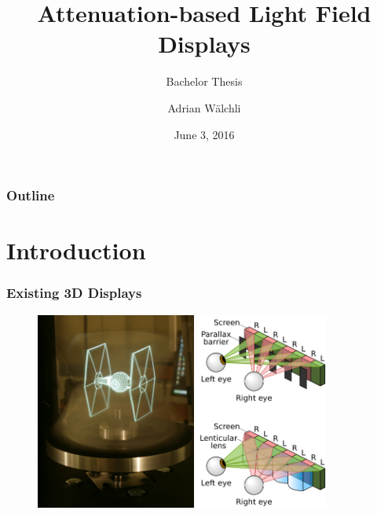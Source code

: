 \documentclass[12pt, compress]{beamer}
\title{Attenuation-based Light Field Displays}
\subtitle{Bachelor Thesis}
\date{June 3, 2016}
\author{Adrian W\"alchli}
\institute{Institut f\"ur Informatik und angewandte Mathematik}
\begin{document}
\setlength{\leftmargini}{0pt}
\setlength{\fboxsep}{0pt}%

\maketitle

\begin{frame}[fragile]
	\frametitle{Outline}
	\tableofcontents
\end{frame}

\section{Introduction}

\begin{frame}[fragile]
	\frametitle{Existing 3D Displays}
	
	\begin{figure}
		\captionsetup[sub]{font=scriptsize}
		{\includegraphics[height=6.5cm]{figures/overview_displays/360_deg_display}}
		\hspace{0.4cm}
		{\includegraphics[height=6.5cm]{figures/overview_displays/parallax_barrier_vs_lenticular}}	
	\end{figure}
\end{frame}
\end{document}
